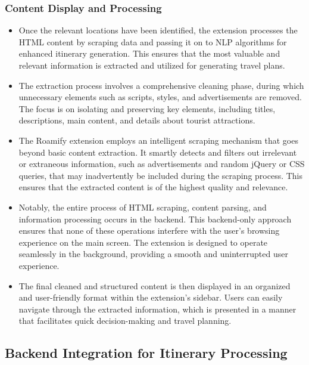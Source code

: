 \documentclass[conference]{IEEEtran}
\begin{document}
    \subsubsection{Content Display and Processing}
        \begin{itemize}
            \item Once the relevant locations have been identified, the extension processes the HTML content by scraping data and passing it on to NLP algorithms for enhanced itinerary generation. This ensures that the most valuable and relevant information is extracted and utilized for generating travel plans.
            \item The extraction process involves a comprehensive cleaning phase, during which unnecessary elements such as scripts, styles, and advertisements are removed. The focus is on isolating and preserving key elements, including titles, descriptions, main content, and details about tourist attractions.
            \item The Roamify extension employs an intelligent scraping mechanism that goes beyond basic content extraction. It smartly detects and filters out irrelevant or extraneous information, such as advertisements and random jQuery or CSS queries, that may inadvertently be included during the scraping process. This ensures that the extracted content is of the highest quality and relevance.
            \item Notably, the entire process of HTML scraping, content parsing, and information processing occurs in the backend. This backend-only approach ensures that none of these operations interfere with the user's browsing experience on the main screen. The extension is designed to operate seamlessly in the background, providing a smooth and uninterrupted user experience.
            \item The final cleaned and structured content is then displayed in an organized and user-friendly format within the extension’s sidebar. Users can easily navigate through the extracted information, which is presented in a manner that facilitates quick decision-making and travel planning.
        \end{itemize}

\subsection{Backend Integration for Itinerary Processing}
\end{document}
